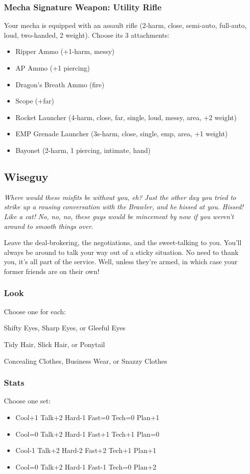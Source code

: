 \subsubsection{Mecha Signature Weapon: Utility Rifle}
Your mecha is equipped with an assault rifle (2-harm, close, semi-auto, full-auto, loud, two-handed, 2 weight). Choose its 3 attachments:
\begin{itemize}
\item Ripper Ammo (+1-harm, messy)
\item AP Ammo (+1 piercing)
\item Dragon's Breath Ammo (fire)
\item Scope (+far)
\item Rocket Launcher (4-harm, close, far, single, loud, messy, area, +2 weight)
\item EMP Grenade Launcher (3s-harm, close, single, emp, area, +1 weight)
\item Bayonet (2-harm, 1 piercing, intimate, hand)
\end{itemize}




\subsection{Wiseguy}
{\itshape Where would these misfits be without you, eh? Just the other
  day you tried to strike up a rousing conversation with the Brawler,
  and he \emph{hissed} at you. Hissed! Like a cat! No, no, no, these
  guys would be mincemeat by now if you weren't around to smooth
  things over.

Leave the deal-brokering, the negotiations, and the sweet-talking to
you. You'll always be around to talk your way out of a sticky
situation. No need to thank you, it's all part of the service. Well,
unless they're armed, in which case your former friends are on their
own!}
\subsubsection{Look}
Choose one for each:

Shifty Eyes, Sharp Eyes, or Gleeful Eyes

Tidy Hair, Slick Hair, or Ponytail

Concealing Clothes, Business Wear, or Snazzy Clothes

\subsubsection{Stats}
Choose one set:
\begin{itemize}
\setlength\itemsep{0em}
\item Cool+1 Talk+2 Hard-1 Fast=0 Tech=0 Plan+1
\item Cool=0 Talk+2 Hard-1 Fast+1 Tech+1 Plan=0
\item Cool-1 Talk+2 Hard-2 Fast+2 Tech+1 Plan+1
\item Cool=0 Talk+2 Hard-1 Fast-1 Tech=0 Plan+2
\end{itemize}

